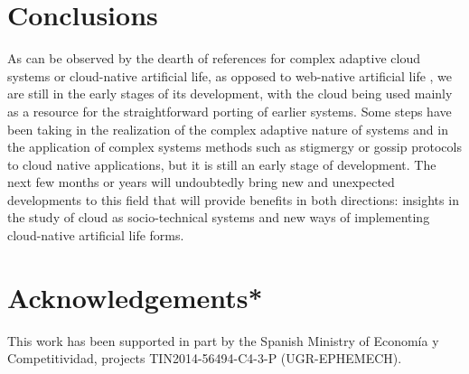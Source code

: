 \documentclass[utf8]{frontiersSCNS} %
\begin{document}
\section{Conclusions}

As can be observed by the dearth of references for complex adaptive cloud
systems or cloud-native artificial life, as opposed to web-native
artificial life \citep{taylor2016webal}, we are still in the early
stages of its development, with the cloud being used mainly as a
resource for the straightforward porting of earlier systems. Some
steps have been taking in the realization of the complex adaptive
nature of systems and in the application of complex systems methods
such as stigmergy or gossip protocols to cloud native applications,
but it is still an early stage of development. The next few months or
years will undoubtedly bring new and unexpected developments to this
field that will provide benefits in both directions: insights in the
study of cloud as socio-technical systems and new ways of implementing
cloud-native artificial life forms.

\section{Acknowledgements*}

This work has been supported in part by the Spanish Ministry of Economía y Competitividad, projects TIN2014-56494-C4-3-P (UGR-EPHEMECH).



\end{document}
